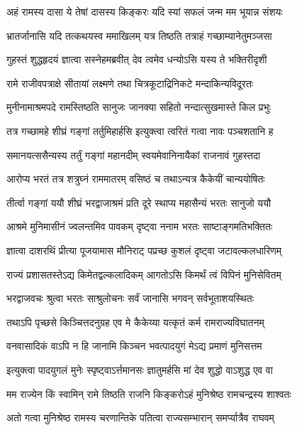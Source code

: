 \twolineshloka
{अहं रामस्य दासा ये तेषां दासस्य किङ्करः}
{यदि स्यां सफलं जन्म मम भूयान्न संशयः} %

\twolineshloka
{भ्रातर्जानासि यदि तत्कथयस्व ममाखिलम्}
{यत्र तिष्ठति तत्राहं गच्छाम्यानेतुमञ्जसा} %

\twolineshloka
{गुहस्तं शुद्धहृदयं ज्ञात्वा सस्नेहमब्रवीत्}
{देव त्वमेव धन्योऽसि यस्य ते भक्तिरीदृशी} %

\twolineshloka
{रामे राजीवपत्राक्षे सीतायां लक्ष्मणे तथा}
{चित्रकूटाद्रिनिकटे मन्दाकिन्यविदूरतः} %

\twolineshloka
{मुनीनामाश्रमपदे रामस्तिष्ठति सानुजः}
{जानक्या सहितो नन्दात्सुखमास्ते किल प्रभुः} %

\twolineshloka
{तत्र गच्छामहे शीघ्रं गङ्गां तर्तुमिहार्हसि}
{इत्युक्त्वा त्वरितं गत्वा नावः पञ्चशतानि ह} %

\twolineshloka
{समानयत्ससैन्यस्य तर्तुं गङ्गां महानदीम्}
{स्वयमेवानिनायैकां राजनावं गुहस्तदा} %

\twolineshloka
{आरोप्य भरतं तत्र शत्रुघ्नं राममातरम्}
{वसिष्ठं च तथाऽन्यत्र कैकेयीं चान्ययोषितः} %

\twolineshloka
{तीर्त्वा गङ्गां ययौ शीघ्रं भरद्वाजाश्रमं प्रति}
{दूरे स्थाप्य महासैन्यं भरतः सानुजो ययौ} %

\twolineshloka
{आश्रमे मुनिमासीनं ज्वलन्तमिव पावकम्}
{दृष्ट्वा ननाम भरतः साष्टाङ्गमतिभक्तितः} %

\twolineshloka
{ज्ञात्वा दाशरथिं प्रीत्या पूजयामास मौनिराट्}
{पप्रच्छ कुशलं दृष्ट्वा जटावल्कलधारिणम्} %

\twolineshloka
{राज्यं प्रशासतस्तेऽद्य किमेतद्वल्कलादिकम्}
{आगतोऽसि किमर्थं त्वं विपिनं मुनिसेवितम्} %

\twolineshloka
{भरद्वाजवचः श्रुत्वा भरतः साश्रुलोचनः}
{सर्वं जानासि भगवन् सर्वभूताशयस्थितः} %

\twolineshloka
{तथाऽपि पृच्छसे किञ्चित्तदनुग्रह एव मे}
{कैकेय्या यत्कृतं कर्म रामराज्यविघातनम्} %

\twolineshloka
{वनवासादिकं वाऽपि न हि जानामि किञ्चन}
{भवत्पादयुगं मेऽद्य प्रमाणं मुनिसत्तम} %

\twolineshloka
{इत्युक्त्वा पादयुगलं मुनेः स्पृष्ट्वाऽर्त्तमानसः}
{ज्ञातुमर्हसि मां देव शुद्धो वाऽशुद्ध एव वा} %

\twolineshloka
{मम राज्येन किं स्वामिन् रामे तिष्ठति राजनि}
{किङ्करोऽहं मुनिश्रेष्ठ रामचन्द्रस्य शाश्वतः} %

\twolineshloka
{अतो गत्वा मुनिश्रेष्ठ रामस्य चरणान्तिके}
{पतित्वा राज्यसम्भारान् समर्प्यात्रैव राघवम्} %

